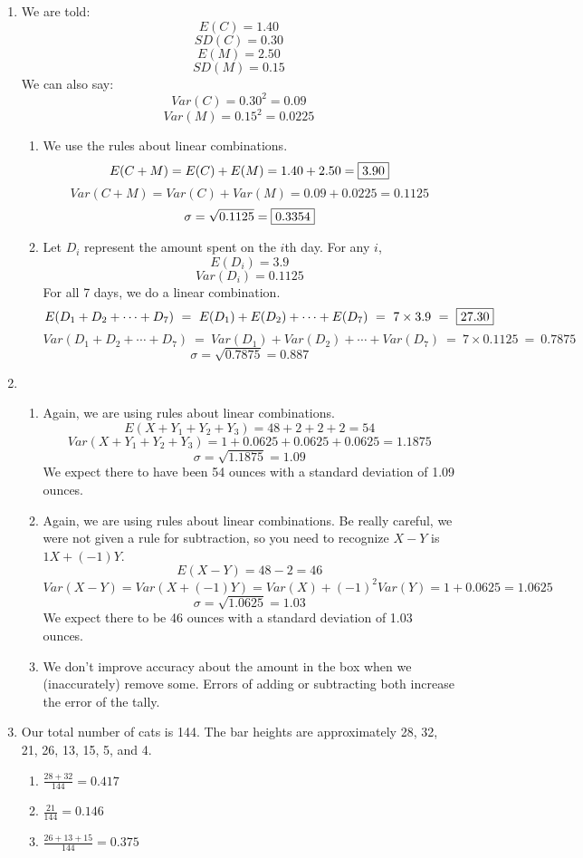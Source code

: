 \documentclass[12pt,letterpaper]{article}
\begin{document}
\begin{enumerate}
\item We are told:
$$E(C) = 1.40 $$
$$SD(C) = 0.30 $$
$$E(M) = 2.50 $$
$$SD(M) = 0.15 $$
We can also say:
$$Var(C) = 0.30^2 = 0.09 $$
$$Var(M) = 0.15^2 = 0.0225 $$
\begin{enumerate}
\item We use the rules about linear combinations.
$$E(C+M) = E(C)+E(M) = 1.40+2.50 = \fbox{3.90} $$
$$Var(C+M) = Var(C)+Var(M) = 0.09+0.0225 = 0.1125 $$
$$\sigma = \sqrt{0.1125} = \fbox{0.3354} $$
\item Let $D_i$ represent the amount spent on the $i$th day. For any $i$,
$$E(D_i) = 3.9$$
$$Var(D_i) = 0.1125$$
For all 7 days, we do a linear combination.
$$E(D_1+D_2+\cdots+D_7) ~=~ E(D_1)+E(D_2)+\cdots+E(D_7) ~=~ 7\times3.9 ~=~ \fbox{27.30} $$
$$Var(D_1+D_2+\cdots+D_7) ~=~ Var(D_1)+Var(D_2)+\cdots+Var(D_7) ~=~ 7\times0.1125 ~=~ 0.7875 $$
$$\sigma = \sqrt{0.7875} = 0.887 $$
\end{enumerate}

\item \begin{enumerate}
\item Again, we are using rules about linear combinations.
$$E(X+Y_1+Y_2+Y_3) = 48+2+2+2 = 54 $$
$$Var(X+Y_1+Y_2+Y_3) = 1+0.0625+0.0625+0.0625 = 1.1875 $$
$$\sigma = \sqrt{1.1875} = 1.09$$
We expect there to have been 54 ounces with a standard deviation of 1.09 ounces.
\item Again, we are using rules about linear combinations. Be really careful, we were not given a rule for subtraction, so you need to recognize $X-Y$ is $1X+(-1)Y$.
$$E(X-Y) = 48-2 = 46 $$
$$Var(X-Y) = Var(X+(-1)Y) = Var(X)+(-1)^2Var(Y) = 1+0.0625 = 1.0625 $$
$$\sigma = \sqrt{1.0625} = 1.03$$
We expect there to be 46 ounces with a standard deviation of 1.03 ounces.
\item We don't improve accuracy about the amount in the box when we (inaccurately) remove some. Errors of adding or subtracting both increase the error of the tally.
\end{enumerate}

\item Our total number of cats is 144. The bar heights are approximately 28, 32, 21, 26, 13, 15, 5, and 4.
\begin{enumerate}
\item $\frac{28+32}{144} = 0.417$
\item $\frac{21}{144} = 0.146$
\item $\frac{26+13+15}{144} = 0.375$
\end{enumerate}


\end{enumerate}
\end{document}
